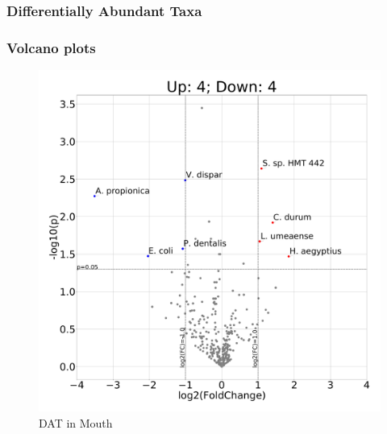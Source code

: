 \documentclass{beamer}
\begin{document}
    \subsubsection{Differentially Abundant Taxa}
    \begin{frame}[allowframebreaks]
        \frametitle{Volcano plots}

        \begin{figure}
            \includegraphics[width=0.5 \linewidth]{figures/Step63/everything.DADA2.homd.Mouth.pdf}
            \caption{DAT in Mouth}
        \end{figure}


\end{frame}
\end{document}
